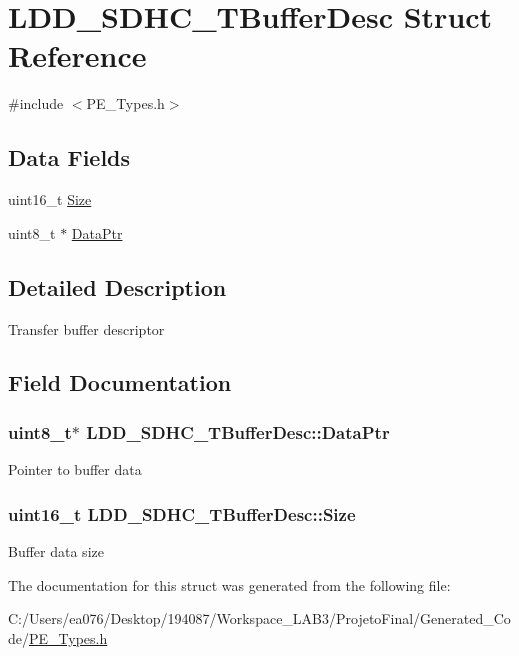 \hypertarget{struct_l_d_d___s_d_h_c___t_buffer_desc}{\section{L\-D\-D\-\_\-\-S\-D\-H\-C\-\_\-\-T\-Buffer\-Desc Struct Reference}
\label{struct_l_d_d___s_d_h_c___t_buffer_desc}
}


{\ttfamily \#include $<$P\-E\-\_\-\-Types.\-h$>$}

\subsection*{Data Fields}
\begin{DoxyCompactItemize}
\item 
uint16\-\_\-t \hyperlink{struct_l_d_d___s_d_h_c___t_buffer_desc_a117f5acff1ada72194a95b38795bca56}{Size}
\item 
uint8\-\_\-t $\ast$ \hyperlink{struct_l_d_d___s_d_h_c___t_buffer_desc_a0349f594a37791792e4a213111173a68}{Data\-Ptr}
\end{DoxyCompactItemize}


\subsection{Detailed Description}
Transfer buffer descriptor 

\subsection{Field Documentation}
\hypertarget{struct_l_d_d___s_d_h_c___t_buffer_desc_a0349f594a37791792e4a213111173a68}{
\subsubsection[{Data\-Ptr}]{\setlength{\rightskip}{0pt plus 5cm}uint8\-\_\-t$\ast$ L\-D\-D\-\_\-\-S\-D\-H\-C\-\_\-\-T\-Buffer\-Desc\-::\-Data\-Ptr}}\label{struct_l_d_d___s_d_h_c___t_buffer_desc_a0349f594a37791792e4a213111173a68}
Pointer to buffer data \hypertarget{struct_l_d_d___s_d_h_c___t_buffer_desc_a117f5acff1ada72194a95b38795bca56}{
\subsubsection[{Size}]{\setlength{\rightskip}{0pt plus 5cm}uint16\-\_\-t L\-D\-D\-\_\-\-S\-D\-H\-C\-\_\-\-T\-Buffer\-Desc\-::\-Size}}\label{struct_l_d_d___s_d_h_c___t_buffer_desc_a117f5acff1ada72194a95b38795bca56}
Buffer data size 

The documentation for this struct was generated from the following file\-:\begin{DoxyCompactItemize}
\item 
C\-:/\-Users/ea076/\-Desktop/194087/\-Workspace\-\_\-\-L\-A\-B3/\-Projeto\-Final/\-Generated\-\_\-\-Code/\hyperlink{_p_e___types_8h}{P\-E\-\_\-\-Types.\-h}\end{DoxyCompactItemize}
